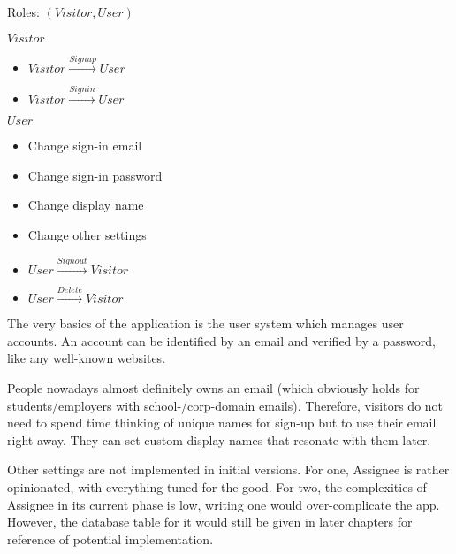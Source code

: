 Roles: $(Visitor, User)$

\begin{samepage}
	$Visitor$
	\begin{itemize}
		\item $Visitor\xrightarrow{Signup}User$

		\item $Visitor\xrightarrow{Signin}User$
	\end{itemize}
\end{samepage}

\begin{samepage}
	$User$
	\begin{itemize}
		\item Change sign-in email

		\item Change sign-in password

		\item Change display name

		\item Change other settings \textdagger{}

		\item $User\xrightarrow{Signout}Visitor$

		\item $User\xrightarrow{Delete}Visitor$
	\end{itemize}
\end{samepage}

The very basics of the application is the user system which manages user
accounts. An account can be identified by an email and verified by a password,
like any well-known websites.

People nowadays almost definitely owns an email (which obviously holds for students/employers
with school-/corp-domain emails). Therefore, visitors do not need to spend time thinking
of unique names for sign-up but to use their email right away. They can set
custom display names that resonate with them later.

\textdagger{} Other settings are not implemented in initial versions. For one, Assignee
is rather opinionated, with everything tuned for the good. For two, the
complexities of Assignee in its current phase is low, writing one would over-complicate
the app. However, the database table for it would still be given in later chapters
for reference of potential implementation.

